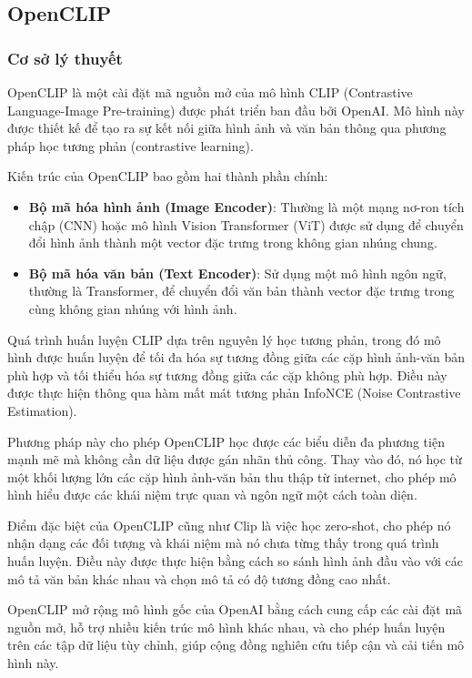 \subsection{OpenCLIP}
\label{sec:open_clip}

\subsubsection{Cơ sở lý thuyết}

OpenCLIP\cite{openclip} là một cài đặt mã nguồn mở của mô hình CLIP (Contrastive Language-Image Pre-training) được phát triển ban đầu bởi OpenAI. Mô hình này được thiết kế để tạo ra sự kết nối giữa hình ảnh và văn bản thông qua phương pháp học tương phản (contrastive learning).

Kiến trúc của OpenCLIP bao gồm hai thành phần chính:
\begin{itemize}
    \item \textbf{Bộ mã hóa hình ảnh (Image Encoder)}: Thường là một mạng nơ-ron tích chập (CNN) hoặc mô hình Vision Transformer (ViT) được sử dụng để chuyển đổi hình ảnh thành một vector đặc trưng trong không gian nhúng chung.
    
    \item \textbf{Bộ mã hóa văn bản (Text Encoder)}: Sử dụng một mô hình ngôn ngữ, thường là Transformer, để chuyển đổi văn bản thành vector đặc trưng trong cùng không gian nhúng với hình ảnh.
\end{itemize}

Quá trình huấn luyện CLIP dựa trên nguyên lý học tương phản, trong đó mô hình được huấn luyện để tối đa hóa sự tương đồng giữa các cặp hình ảnh-văn bản phù hợp và tối thiểu hóa sự tương đồng giữa các cặp không phù hợp. Điều này được thực hiện thông qua hàm mất mát tương phản InfoNCE (Noise Contrastive Estimation).

Phương pháp này cho phép OpenCLIP học được các biểu diễn đa phương tiện mạnh mẽ mà không cần dữ liệu được gán nhãn thủ công. Thay vào đó, nó học từ một khối lượng lớn các cặp hình ảnh-văn bản thu thập từ internet, cho phép mô hình hiểu được các khái niệm trực quan và ngôn ngữ một cách toàn diện.

Điểm đặc biệt của OpenCLIP cũng như Clip là việc học zero-shot, cho phép nó nhận dạng các đối tượng và khái niệm mà nó chưa từng thấy trong quá trình huấn luyện. Điều này được thực hiện bằng cách so sánh hình ảnh đầu vào với các mô tả văn bản khác nhau và chọn mô tả có độ tương đồng cao nhất.

OpenCLIP mở rộng mô hình gốc của OpenAI bằng cách cung cấp các cài đặt mã nguồn mở, hỗ trợ nhiều kiến trúc mô hình khác nhau, và cho phép huấn luyện trên các tập dữ liệu tùy chỉnh, giúp cộng đồng nghiên cứu tiếp cận và cải tiến mô hình này.

